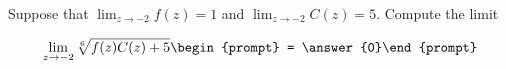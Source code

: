 \documentclass{ximera}
\author{Matthew Carr}
\begin{document}
\begin{exercise}
Suppose that $\lim_{z\to-2}f(z)=1$ and $\lim_{z\to-2}C(z)=5$. Compute the limit

\[
\lim_{z\to -2 } \sqrt[6]{f(z)C(z)+5}\begin{prompt} = \answer{0}\end{prompt}
\]
\end{exercise}
\end{document}
